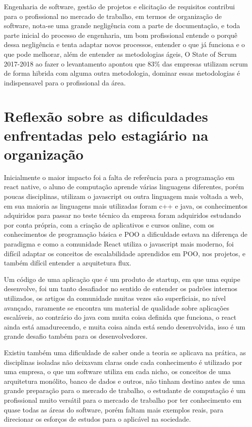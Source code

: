 \documentclass{ufersa}
\begin{document}
Engenharia de software, gestão de projetos e elicitação de requisitos contribui para o profissional no mercado de trabalho, em termos de organização de software, nota-se uma grande negligência com a parte de documentação, e toda parte inicial do processo de engenharia, um bom profissional entende o porquê dessa negligência e tenta adaptar novos processos, entender o que já funciona e o que pode melhorar, além de entender as metodologias ágeis, O State of Scrum 2017-2018 ao fazer o levantamento apontou que 83\% das empresas utilizam scrum de forma hibrida com alguma outra metodologia, dominar essas metodologias é indispensavel para o profissional da área.

\section{Reflexão sobre as dificuldades enfrentadas pelo estagiário na organização}

Inicialmente o maior impacto foi a falta de referência para a programação em react native,  o aluno de computação aprende várias linguagens diferentes, porém poucas disciplinas, utilizam o javascript ou outra linguagem mais voltada a web, em sua maioria as linguagens mais utilizadas foram c++ e java, os conhecimentos adquiridos para passar no teste técnico da empresa foram adquiridos estudando por conta própria, com a criação de aplicativos e cursos online,  com os conhecimentos de programação básica e POO a dificuldade estava na diferença de paradigma e como a comunidade React utiliza o javascript mais moderno, foi difícil adaptar os conceitos de escalabilidade aprendidos em POO, nos projetos, e também difícil entender a arquitetura flux. 

Um código de uma aplicação que é um produto de startup, em que uma equipe desenvolve, foi um tanto desafiador no sentido de entender os padrões internos utilizados, os artigos da comunidade muitas vezes são superficiais, no nível avançado, raramente se encontra um material de qualidade sobre aplicações escaláveis, ao contrário do java com muita coisa definida que funciona, o react ainda está amadurecendo, e muita coisa ainda está sendo desenvolvida, isso é um grande desafio também para os desenvolvedores.

Existiu também uma dificuldade de saber onde a teoria se aplicava na prática, as disciplinas isoladas não deixavam claras onde cada conhecimento é utilizado por uma empresa, o que um software utiliza em cada nicho, os conceitos de uma arquitetura monólito, banco de dados e outros, não tinham destino antes de uma grande preparação para o mercado de trabalho, o estudante de computação é um profissional muito versátil para o mercado de trabalho por ter conhecimento em quase todas as áreas do software, porém faltam mais exemplos reais, para direcionar os esforços de estudos para o aplicável na sociedade.   
\end{document}
